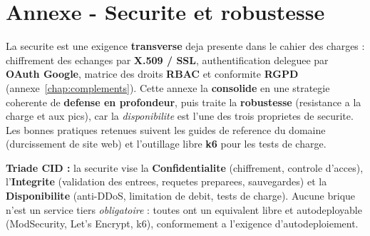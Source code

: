 
\chapter{Annexe - Securite et robustesse}
\label{chap:securite}
La securite est une exigence \textbf{transverse} deja presente dans le cahier
des charges : chiffrement des echanges par \textbf{X.509 / SSL}, authentification
deleguee par \textbf{OAuth Google}, matrice des droits \textbf{RBAC} et
conformite \textbf{RGPD} (annexe~\ref{chap:complements}). Cette annexe la
\textbf{consolide} en une strategie coherente de \textbf{defense en profondeur},
puis traite la \textbf{robustesse} (resistance a la charge et aux pics), car la
\emph{disponibilite} est l'une des trois proprietes de securite. Les bonnes
pratiques retenues suivent les guides de reference du domaine (durcissement de
site web) et l'outillage libre \textbf{k6} pour les tests de charge.

\begin{encadre}
\textbf{Triade CID :} la securite vise la \textbf{Confidentialite} (chiffrement,
controle d'acces), l'\textbf{Integrite} (validation des entrees, requetes
preparees, sauvegardes) et la \textbf{Disponibilite} (anti-DDoS, limitation de
debit, tests de charge). Aucune brique n'est un service tiers \emph{obligatoire} :
toutes ont un equivalent libre et autodeployable (ModSecurity, Let's Encrypt,
k6), conformement a l'exigence d'autodeploiement.
\end{encadre}

